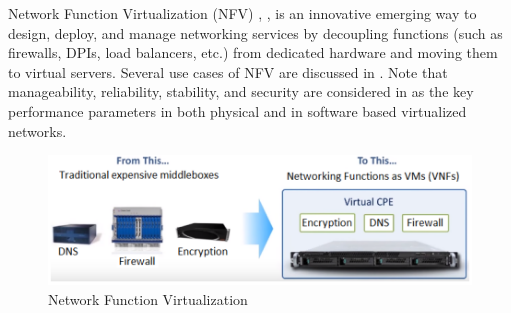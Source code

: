 Network Function Virtualization (NFV) \cite{1}, \cite{2}, \cite{3} is an innovative emerging way to
design, deploy, and manage networking services by decoupling functions (such as firewalls,
DPIs, load balancers, etc.) from dedicated hardware and moving them to virtual servers.
Several use cases of NFV are discussed in \cite{4}. Note that manageability, reliability, stability, and security are considered in \cite{4} as the key performance parameters in both physical
and in software based virtualized networks.

\begin{figure}[h]
    \centering
    \includegraphics[width=1\textwidth]{2_2_2image}
    \caption{Network Function Virtualization}
    \label{fig:2_2_2image}
\end{figure}
